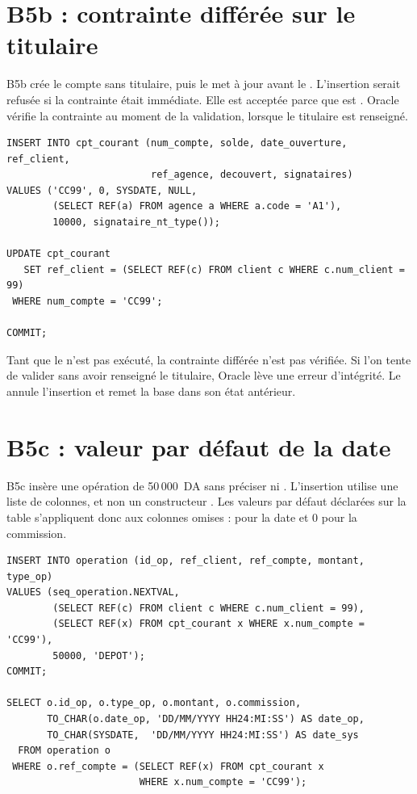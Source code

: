 \section{B5b : contrainte différée sur le titulaire}

B5b crée le compte  sans titulaire, puis le met à jour avant le
. L'insertion serait refusée si la contrainte était immédiate.
Elle est acceptée parce que  est
. Oracle vérifie la contrainte au moment de
la validation, lorsque le titulaire est renseigné.

\begin{lstlisting}[caption={B5b : insertion sans titulaire, puis mise à jour.},label={lst:b5b}]
INSERT INTO cpt_courant (num_compte, solde, date_ouverture, ref_client,
                         ref_agence, decouvert, signataires)
VALUES ('CC99', 0, SYSDATE, NULL,
        (SELECT REF(a) FROM agence a WHERE a.code = 'A1'),
        10000, signataire_nt_type());

UPDATE cpt_courant
   SET ref_client = (SELECT REF(c) FROM client c WHERE c.num_client = 99)
 WHERE num_compte = 'CC99';

COMMIT;
\end{lstlisting}

\begin{attentionbox}
Tant que le  n'est pas exécuté, la contrainte différée n'est pas
vérifiée. Si l'on tente de valider sans avoir renseigné le titulaire, Oracle
lève une erreur d'intégrité. Le  annule l'insertion et remet la
base dans son état antérieur.
\end{attentionbox}

\section{B5c : valeur par défaut de la date}

B5c insère une opération de 50\,000~DA sans préciser  ni
. L'insertion utilise une liste de colonnes, et non un
constructeur . Les valeurs par défaut déclarées sur
la table s'appliquent donc aux colonnes omises :  pour la date et
0 pour la commission.

\begin{lstlisting}[caption={B5c : opération sans date explicite.},label={lst:b5c}]
INSERT INTO operation (id_op, ref_client, ref_compte, montant, type_op)
VALUES (seq_operation.NEXTVAL,
        (SELECT REF(c) FROM client c WHERE c.num_client = 99),
        (SELECT REF(x) FROM cpt_courant x WHERE x.num_compte = 'CC99'),
        50000, 'DEPOT');
COMMIT;

SELECT o.id_op, o.type_op, o.montant, o.commission,
       TO_CHAR(o.date_op, 'DD/MM/YYYY HH24:MI:SS') AS date_op,
       TO_CHAR(SYSDATE,  'DD/MM/YYYY HH24:MI:SS') AS date_sys
  FROM operation o
 WHERE o.ref_compte = (SELECT REF(x) FROM cpt_courant x
                       WHERE x.num_compte = 'CC99');
\end{lstlisting}

